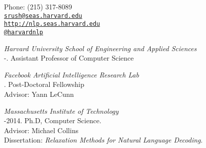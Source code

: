 \documentclass[11pt]{article}
\makeatletter
\def\myemail{srush@seas.harvard.edu}
\def\myweb{http://nlp.seas.harvard.edu}
\def\myphone{(215) 317-8089}
\def\myfax{harvardnlp}
\makeatother
\begin{document}
\begin{minipage}[t]{2.95in}
  
\end{minipage}
\hfill     
\hfill
\begin{minipage}[t]{1.7in}
  \flushright \footnotesize Phone: \myphone \\ 
  {\scriptsize  \texttt{\href{mailto:\myemail}{\myemail}}} \\
  {\scriptsize  \texttt{\href{\myweb}{\myweb}}} \\
  {\scriptsize  \texttt{\href{http://twitter.com/\myfax}{@\myfax}}} \\
\end{minipage}


\medskip

\reversemarginpar

\medskip       


\noindent\emph{Harvard University School of Engineering and Applied Sciences \vspace{0.01in}}\\
-.  Assistant Professor of Computer Science

\medskip       
\noindent\emph{Facebook Artificial Intelligence Research Lab \vspace{0.01in}}\\
.  Post-Doctoral Fellowship\\
\ind Advisor: Yann LeCunn

\bigskip


 
\noindent\emph{Massachusetts Institute of Technology \vspace{0.01in}}\\
-2014.  Ph.D, Computer Science.\\
\ind Advisor: Michael Collins\\
\ind Dissertation: \emph{Relaxation Methods for Natural Language Decoding}. %
\end{document}
